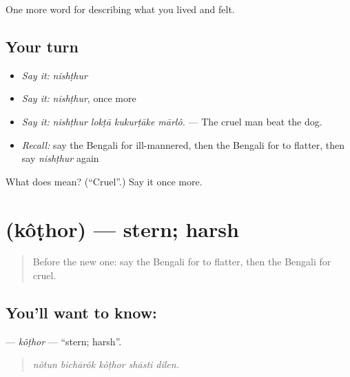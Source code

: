 \begin{grammarlens}[title={What you've built}]
One more word for describing what you lived and felt.
\end{grammarlens}

\subsection*{Your turn}
\begin{itemize}
\raggedright
  \item \emph{Say it:} \emph{nishṭhur}
  \item \emph{Say it:} \emph{nishṭhur}, once more
  \item \emph{Say it:} \emph{nishṭhur lokṭā kukurṭāke mārlô.} — The cruel man beat the dog.
  \item \emph{Recall:} say the Bengali for ill-mannered, then the Bengali for to flatter, then say \emph{nishṭhur} again
\end{itemize}

\begin{tcolorbox}[breakable,colback=teal!4,colframe=teal!35!black,title={Before you move on}]
What does  mean? (\textquotedblleft{}Cruel\textquotedblright{}.) Say it once more.
\end{tcolorbox}
\section[\texorpdfstring{\bn{কঠোর} (kôṭhor)}{কঠোর (kôṭhor)}]{ (kôṭhor) — stern; harsh}

\label{lesson:BN-C460-kothor}



\begin{quote}
Before the new one: say the Bengali for to flatter, then the Bengali for cruel.
\end{quote}

\subsection*{You'll want to know: }
\textbf{} — \emph{kôṭhor} — \textquotedblleft{}stern; harsh\textquotedblright{}.

\begin{quote}
    
\end{quote}

\begin{quote}
\emph{nôtun bichārôk kôṭhor shāsti dilen.}
\end{quote}

